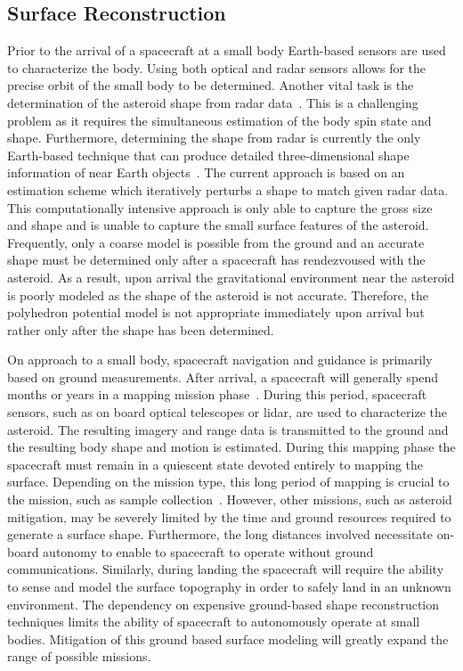 
\subsection{Surface Reconstruction}

Prior to the arrival of a spacecraft at a small body Earth-based sensors are used to characterize the body.
Using both optical and radar sensors allows for the precise orbit of the small body to be determined.
Another vital task is the determination of the asteroid shape from radar data~\cite{hudson1994,busch2011}.
This is a challenging problem as it requires the simultaneous estimation of the body spin state and shape.
Furthermore, determining the shape from radar is currently the only Earth-based technique that can produce detailed three-dimensional shape information of near Earth objects~\cite{greenberg2015}.
The current approach is based on an estimation scheme which iteratively perturbs a shape to match given radar data.
This computationally intensive approach is only able to capture the gross size and shape and is unable to capture the small surface features of the asteroid.
Frequently, only a coarse model is possible from the ground and an accurate shape must be determined only after a spacecraft has rendezvoused with the asteroid.
As a result, upon arrival the gravitational environment near the asteroid is poorly modeled as the shape of the asteroid is not accurate.
Therefore, the polyhedron potential model is not appropriate immediately upon arrival but rather only after the shape has been determined.

On approach to a small body, spacecraft navigation and guidance is primarily based on ground measurements.
After arrival, a spacecraft will generally spend months or years in a mapping mission phase~\cite{kubota2003,cole1998}.
During this period, spacecraft sensors, such as on board optical telescopes or \gls{lidar}, are used to characterize the asteroid.
The resulting imagery and range data is transmitted to the ground and the resulting body shape and motion is estimated. 
During this mapping phase the spacecraft must remain in a quiescent state devoted entirely to mapping the surface.
Depending on the mission type, this long period of mapping is crucial to the mission, such as sample collection~\cite{gates2015}. 
However, other missions, such as asteroid mitigation, may be severely limited by the time and ground resources required to generate a surface shape.
Furthermore, the long distances involved necessitate on-board autonomy to enable to spacecraft to operate without ground communications.
Similarly, during landing the spacecraft will require the ability to sense and model the surface topography in order to safely land in an unknown environment.
The dependency on expensive ground-based shape reconstruction techniques limits the ability of spacecraft to autonomously operate at small bodies.
Mitigation of this ground based surface modeling will greatly expand the range of possible missions.

